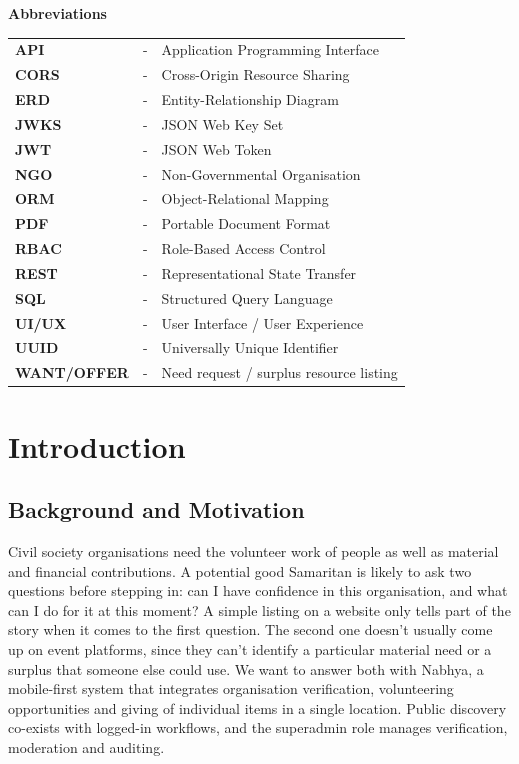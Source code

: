 \cleardoublepage
{}
\thispagestyle{empty}
\begin{center}{\Huge\textbf{Abbreviations}}\end{center}
\vspace{0.3in}
\begin{longtable}{p{}cp{}}
\textbf{API} & - & Application Programming Interface\\
\textbf{CORS} & - & Cross-Origin Resource Sharing\\
\textbf{ERD} & - & Entity-Relationship Diagram\\
\textbf{JWKS} & - & JSON Web Key Set\\
\textbf{JWT} & - & JSON Web Token\\
\textbf{NGO} & - & Non-Governmental Organisation\\
\textbf{ORM} & - & Object-Relational Mapping\\
\textbf{PDF} & - & Portable Document Format\\
\textbf{RBAC} & - & Role-Based Access Control\\
\textbf{REST} & - & Representational State Transfer\\
\textbf{SQL} & - & Structured Query Language\\
\textbf{UI/UX} & - & User Interface / User Experience\\
\textbf{UUID} & - & Universally Unique Identifier\\
\textbf{WANT/OFFER} & - & Need request / surplus resource listing\\
\end{longtable}

\cleardoublepage
{}

\chapter{Introduction}
\label{ch:introduction}

\section{Background and Motivation}
Civil society organisations need the volunteer work of people as well as material and financial contributions. A potential good Samaritan is likely to ask two questions before stepping in: can I have confidence in this organisation, and what can I do for it at this moment? A simple listing on a website only tells part of the story when it comes to the first question. The second one doesn't usually come up on event platforms, since they can't identify a particular material need or a surplus that someone else could use.
We want to answer both with Nabhya, a mobile-first system that integrates organisation verification, volunteering opportunities and giving of individual items in a single location. Public discovery co-exists with logged-in workflows, and the superadmin role manages verification, moderation and auditing.

